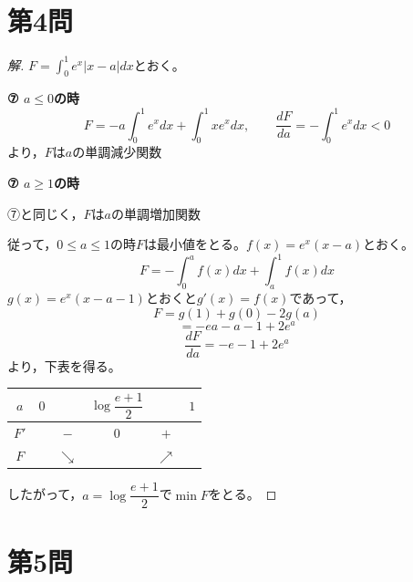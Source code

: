 \documentclass[../main.tex]{subfiles}
\begin{document}
\newpage

\section*{第4問}

\begin{proof}[解]
  $F=\displaystyle\int_0^1e^x|x-a|dx$とおく。

  \textbf{⑦ $a\le0$の時}
  \[
    F=-a\int_0^1e^xdx+\int_0^1xe^xdx, \qquad \frac{dF}{da}=-\int_0^1e^xdx<0
  \]
  より，$F$は$a$の単調減少関数

  \textbf{⑦ $a\ge1$の時}

  ⑦と同じく，$F$は$a$の単調増加関数

  従って，$0\le a\le1$の時$F$は最小値をとる。$f(x)=e^x(x-a)$とおく。
  \[
    F=-\int_0^af(x)dx+\int_a^1f(x)dx
  \]
  $g(x)=e^x(x-a-1)$とおくと$g'(x)=f(x)$であって，
  \[
    F=g(1)+g(0)-2g(a)
  \]
  \[
    =-ea-a-1+2e^a
  \]
  \[
    \frac{dF}{da}=-e-1+2e^a
  \]
  より，下表を得る。
  \begin{center}
    \begin{tabular}{c|ccccc}
      $a$ & $0$ & & $\log\dfrac{e+1}{2}$ & & $1$ \\
      \hline
      $F'$ & & $-$ & $0$ & $+$ & \\
      \hline
      $F$ & & $\searrow$ & & $\nearrow$ &
    \end{tabular}
  \end{center}
  したがって，$a=\log\dfrac{e+1}{2}$で$\min F$をとる。
\end{proof}

\newpage

\section*{第5問}
\end{document}
